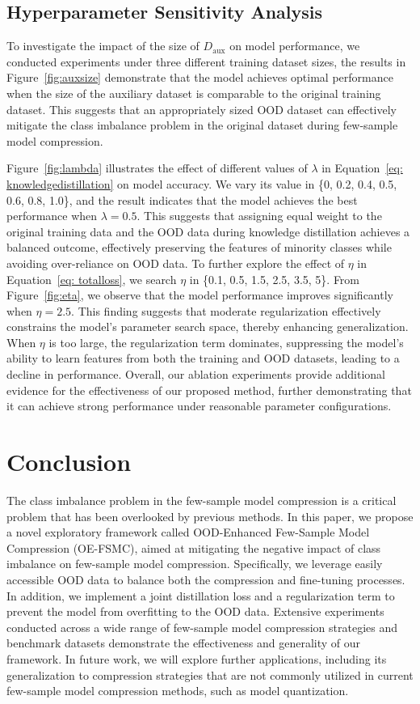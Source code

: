 \documentclass[twoside,11pt]{article}
\begin{document}
\subsection{Hyperparameter Sensitivity Analysis}
To investigate the impact of the size of $ D_{\text{aux}}$ on model performance, we conducted experiments under three different training dataset sizes, the results in Figure~\ref{fig:auxsize} demonstrate that the model achieves optimal performance when the size of the auxiliary dataset is comparable to the original training dataset. This suggests that an appropriately sized OOD dataset can effectively mitigate the class imbalance problem in the original dataset during few-sample model compression.


Figure~\ref{fig:lambda} illustrates the effect of different values of $\lambda$ in Equation~\ref{eq: knowledgedistillation} on model accuracy. We vary its value in \{0, 0.2, 0.4, 0.5, 0.6, 0.8, 1.0\}, and the result indicates that the model achieves the best performance when 
$\lambda=0.5$. This suggests that assigning equal weight to the original training data and the OOD data during knowledge distillation achieves a balanced outcome, effectively preserving the features of minority classes while avoiding over-reliance on OOD data. To further explore the effect of $\eta$ in Equation~\ref{eq: totalloss}, we search $\eta$ in \{0.1, 0.5, 1.5, 2.5, 3.5, 5\}. From Figure~\ref{fig:eta}, we observe that the model performance improves significantly when $\eta=2.5$. This finding suggests that moderate regularization effectively constrains the model’s parameter search space, thereby enhancing generalization. When $\eta$ is too large, the regularization term dominates, suppressing the model’s ability to learn features from both the training and OOD datasets, leading to a decline in performance. Overall, our ablation experiments provide additional evidence for the effectiveness of our proposed method, further demonstrating that it can achieve strong performance under reasonable parameter configurations.


\section{Conclusion}
The class imbalance problem in the few-sample model compression is a critical problem that has been overlooked by previous methods. In this paper, we propose a novel exploratory framework called OOD-Enhanced Few-Sample Model Compression (OE-FSMC), aimed at mitigating the negative impact of class imbalance on few-sample model compression. Specifically, we leverage easily accessible OOD data to balance both the compression and fine-tuning processes. In addition, we implement a joint distillation loss and a regularization term to prevent the model from overfitting to the OOD data. Extensive experiments conducted across a wide range of few-sample model compression strategies and benchmark datasets demonstrate the effectiveness and generality of our framework. In future work, we will explore further applications, including its generalization to compression strategies that are not commonly utilized in current few-sample model compression methods, such as model quantization.
\end{document}
